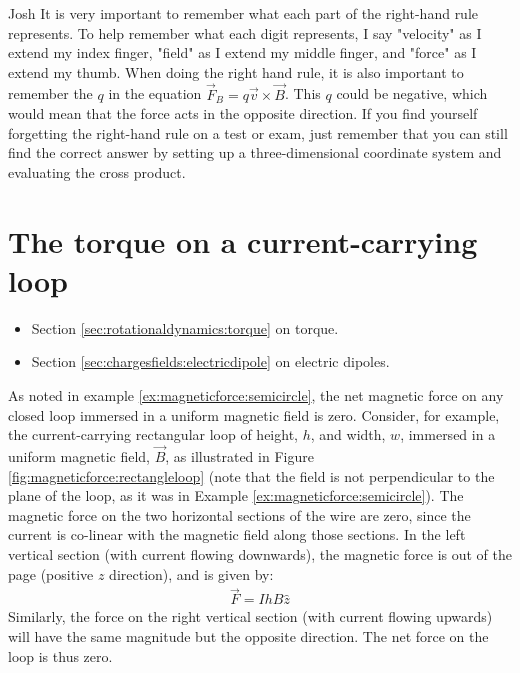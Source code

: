 \begin{studentOpinion}{Josh}{}
	It is very important to remember what each part of the right-hand rule represents. To help remember what each digit represents, I say "velocity" as I extend my index finger, "field" as I extend my middle finger, and "force" as I extend my thumb. When doing the right hand rule, it is also important to remember the $q$ in the equation $\vec F_B = q\vec v \times \vec B$. This $q$ could be negative, which would mean that the force acts in the opposite direction.
	If you find yourself forgetting the right-hand rule on a test or exam, just remember that you can still find the correct answer by setting up a three-dimensional coordinate system and evaluating the cross product.
\end{studentOpinion}
\section{The torque on a current-carrying loop}
\begin{review}
	\begin{itemize}
		\item Section \ref{sec:rotationaldynamics:torque} on torque.
		\item Section \ref{sec:chargesfields:electricdipole} on electric dipoles.
	\end{itemize}
\end{review}
As noted in example \ref{ex:magneticforce:semicircle}, the net magnetic force on any closed loop immersed in a uniform magnetic field is zero. Consider, for example, the current-carrying rectangular loop of height, $h$, and width, $w$, immersed in a uniform magnetic field, $\vec B$, as illustrated in Figure \ref{fig:magneticforce:rectangleloop} (note that the field is not perpendicular to the plane of the loop, as it was in Example \ref{ex:magneticforce:semicircle}).
The magnetic force on the two horizontal sections of the wire are zero, since the current is co-linear with the magnetic field along those sections. In the left vertical section (with current flowing downwards), the magnetic force is out of the page (positive $z$ direction), and is given by:
\begin{align*}
\vec F = IhB\hat z
\end{align*}
Similarly, the force on the right vertical section (with current flowing upwards) will have the same magnitude but the opposite direction. The net force on the loop is thus zero. 

